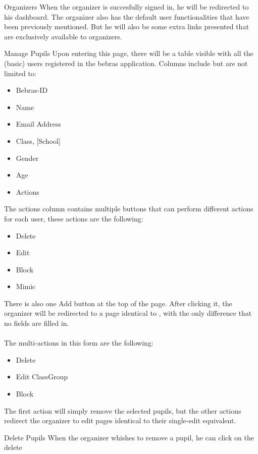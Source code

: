 \begin{section}{Organizers}
	\label{sec:organizer}
	When the organizer is succesfully signed in, he will be redirected to his dashboard.
	The organizer also has the default user functionalities that have been previously
	mentioned. But he will also be some extra links presented that are exclusively
	available to organizers.
	
	\begin{subsection}{Manage Pupils}
		\label{sec:organizer_manage_pupils}
		Upon entering this page, there will be a table visible with all the (basic) users
		registered in the bebras application. Columns include but are not limited to:
		\begin{itemize}
			\item Bebras-ID
			\item Name
			\item Email Address
			\item Class, [School]
			\item Gender
			\item Age
			\item Actions
		\end{itemize}
		The actions column contains multiple buttons that can perform different actions
		for each user, these actions are the following:
		\begin{itemize}
			\item Delete
			\item Edit
			\item Block
			\item Mimic
		\end{itemize}
		There is also one Add button at the top of the page. After clicking it, the
		organizer will be redirected to a page identical to
		, with the only difference that no fields
		are filled in. \\
		\\
		The multi-actions in this form are the following:
		\begin{itemize}
			\item Delete
			\item Edit ClassGroup
			\item Block
		\end{itemize}
		The first action will simply remove the selected pupils, but the other actions
		redirect the organizer to edit pages identical to their single-edit equivalent.
		\begin{subsubsection}{Delete Pupils}
			When the organizer whishes to remove a pupil, he can click on the delete

\end{subsubsection}
\end{subsection}
\end{section}
